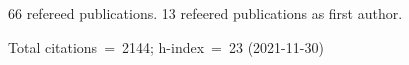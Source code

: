 66 refereed publications. 13 refeered publications as first author.

Total citations~=~2144; h-index~=~23 (2021-11-30)